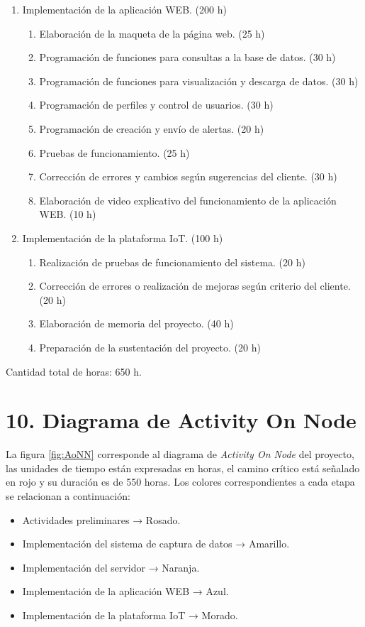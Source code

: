 \documentclass[
11pt, %
codirector, %
]{charter}
\begin{document}
\begin{enumerate}
\item Implementación de la aplicación WEB. (200 h)
	\begin{enumerate}
	\item Elaboración de la maqueta de la página web. (25 h)
	\item Programación de funciones para consultas a la base de datos. (30 h)
	\item Programación de funciones para visualización y descarga de datos. (30 h)
	\item Programación de perfiles y control de usuarios. (30 h)
	\item Programación de creación y envío de alertas. (20 h)
	\item Pruebas de funcionamiento. (25 h)
	\item Corrección de errores y cambios según sugerencias del cliente. (30 h)
	\item Elaboración de video explicativo del funcionamiento de la aplicación WEB. (10 h)
	\end{enumerate}
	
\item Implementación de la plataforma IoT. (100 h)
	\begin{enumerate}
	\item Realización de pruebas de funcionamiento del sistema. (20 h)
	\item Corrección de errores o realización de mejoras según criterio del cliente. (20 h)
	\item Elaboración de memoria del proyecto. (40 h)
	\item Preparación de la sustentación del proyecto. (20 h)
	\end{enumerate}
\end{enumerate}

Cantidad total de horas: 650 h.




\section{10. Diagrama de Activity On Node}
\label{sec:AoN}


La figura \ref{fig:AoNN} corresponde al diagrama de \textit{Activity On Node} del proyecto, las unidades de tiempo están expresadas en horas, el camino crítico está señalado en rojo y su duración es de 550 horas.
Los colores correspondientes a cada etapa se relacionan a continuación:
\begin{itemize}
       \item Actividades preliminares → Rosado.
       \item Implementación del sistema de captura de datos → Amarillo.
       \item Implementación del servidor → Naranja.
       \item Implementación de la aplicación WEB → Azul.
       \item Implementación de la plataforma IoT → Morado.
       \end{itemize}
\end{document}
